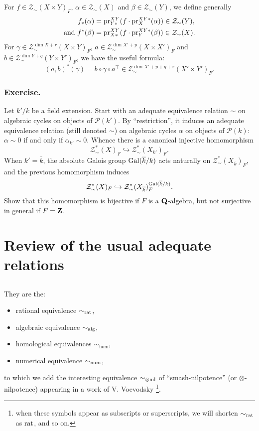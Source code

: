 \documentclass[../main.tex]{subfiles}
\begin{document}
\subsection{} For $f \in \mathcal{Z}_{\sim}(X \times Y)_F$, $\alpha \in \mathcal{Z}_{\sim}(X)$ and $\beta \in \mathcal{Z}_{\sim}(Y)$, we define generally
\begin{align*}
    f_*(\alpha) &= \mathrm{pr}^{XY}_{Y*}(f \cdot \mathrm{pr}^{XY*}_X (\alpha)) \in \mathcal{Z}_{\sim}(Y),\\
    \text{and } f^*(\beta) &= \mathrm{pr}^{XY}_{X*}(f \cdot \mathrm{pr}^{XY*}_Y(\beta)) \in \mathcal{Z}_{\sim}(X).
\end{align*}
For $\gamma \in \mathcal{Z}^{\dim X + r}_{\sim}(X \times Y)_F$, $a \in \mathcal{Z}^{\dim X' + p}_{\sim}(X \times X')_F$ and $b \in \mathcal{Z}^{\dim Y + q}_{\sim}(Y \times Y')_F$, we have the useful formula:
$$(a, b)^*(\gamma) = b \circ \gamma \circ a^{\top} \in \mathcal{Z}^{\dim X' + p + q + r}_{\sim}(X' \times Y')_F.$$

\subsubsection{Exercise.} Let $k'/k$ be a field extension.
Start with an adequate equivalence relation $\sim$ on algebraic cycles on objects of $\mathcal{P}(k')$.
By \enquote{restriction}, it induces an adequate equivalence relation (still denoted $\sim$) on algebraic cycles $\alpha$ on objects of $\mathcal{P}(k)$: $\alpha \sim 0$ if and only if $\alpha_{k'} \sim 0$.
Whence there is a canonical injective homomorphism
$$\mathcal{Z}^*_{\sim}(X)_F \hookrightarrow \mathcal{Z}^*_{\sim}(X_{k'})_F.$$
When $k' = \overline{k}$, the absolute Galois group $\operatorname{Gal}(\overline{k}/k)$ acts naturally on $\mathcal{Z}^*_{\sim}(X_{\overline{k}})_F$, and the previous homomorphism induces
$$\mathcal{Z}^*_{\sim}(X)_F \hookrightarrow \mathcal{Z}^*_{\sim}(X_{\overline{k}})_F^{\operatorname{Gal}(\overline{k}/k)}.$$
Show that this homomorphism is bijective if $F$ is a $\mathbf{Q}$-algebra, but not surjective in general if $F = \mathbf{Z}$.

\section{Review of the usual adequate relations}

\subsection{} They are the:
\begin{itemize}
    \item rational equivalence $\sim_{\mathrm{rat}}$,
    \item algebraic equivalence $\sim_{\mathrm{alg}}$,
    \item homological equivalences $\sim_{\hom}$,
    \item numerical equivalence $\sim_{\mathrm{num}}$,
\end{itemize}
to which we add the interesting equivalence $\sim_{\otimes\mathrm{nil}}$ of \enquote{smash-nilpotence} (or $\otimes$-nilpotence) appearing in a work of V. Voevodsky \cite{voevodsky95}\footnote{when these symbols appear as subscripts or superscripts, we will shorten $\sim_{\mathrm{rat}}$ as $\mathrm{rat}$, and so on.}.
\end{document}

